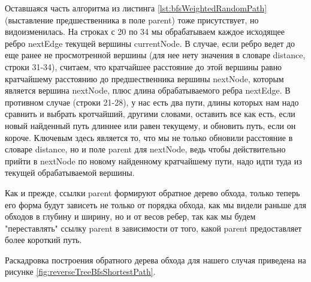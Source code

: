 \documentclass[../article.tex]{subfiles}
\begin{document}
Оставшаяся часть алгоритма из листинга \ref{lst:bfsWeightedRandomPath} (выставление предшественника в поле {\firacodebold parent}) тоже присутствует, но видоизменилась. На строках с 20 по 34 мы обрабатываем каждое исходящее ребро {\firacodebold nextEdge} текущей вершины {\firacodebold currentNode}. В случае, если ребро ведет до еще ранее не просмотренной вершины (для нее нету значения в словаре {\firacodebold distance}, строки 31-34), считаем, что кратчайшее расстояние до этой вершины равно кратчайшему расстоянию до предшественника вершины {\firacodebold nextNode}, которым является вершина {\firacodebold nextNode}, плюс длина обрабатываемого ребра {\firacodebold nextEdge}. В противном случае (строки 21-28), у нас есть два пути, длины которых нам надо сравнить и выбрать кротчайший, другими словами, оставить все как есть, если новый найденный путь длиннее или равен текущему, и обновить путь, если он короче. Ключевым здесь является то, что мы не только обновили расстояние в словаре {\firacodebold distance}, но и поле {\firacodebold parent} для {\firacodebold nextNode}, ведь чтобы действительно прийти в nextNode по новому найденному кратчайшему пути, надо идти туда из текущей обрабатываемой вершины.

Как и прежде, ссылки {\firacodebold parent} формируют обратное дерево обхода, только теперь его форма будут зависеть не только от порядка обхода, как мы видели раньше для обходов в глубину и ширину, но и от весов ребер, так как мы будем "переставлять" ссылку {\firacodebold parent} в зависимости от того, какой {\firacodebold parent} предоставляет более короткий путь.

Раскадровка построения обратного дерева обхода для нашего случая приведена на рисунке \ref{fig:reverseTreeBfsShortestPath}.
\end{document}
